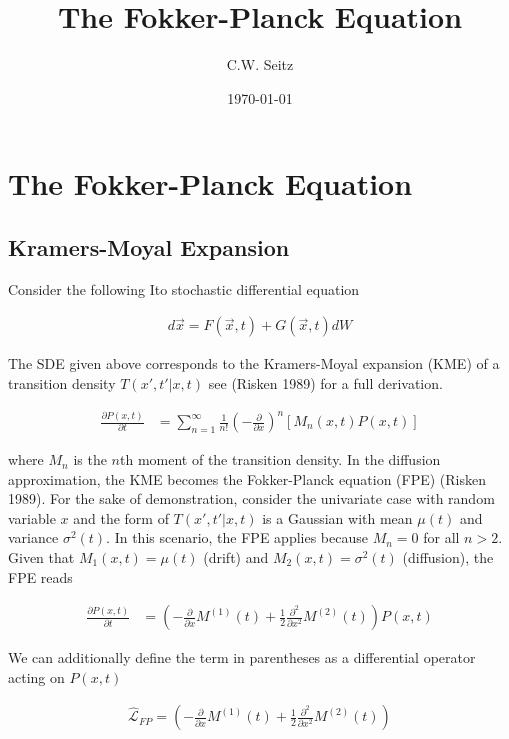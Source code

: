 \documentclass{article}
\title{The Fokker-Planck Equation}
\author{C.W. Seitz}
\date{\today}
\begin{document}
\maketitle

\section{The Fokker-Planck Equation}

\subsection{Kramers-Moyal Expansion}

Consider the following Ito stochastic differential equation 

\begin{align*}
d\vec{x} = F(\vec{x},t) + G(\vec{x},t)dW
\end{align*}

The SDE given above corresponds to the Kramers-Moyal expansion (KME) of a transition density $T(x',t'|x,t)$ see (Risken 1989) for a full derivation.

\begin{align}
\frac{\partial P(x,t)}{\partial t}  &= \sum_{n=1}^{\infty} \frac{1}{n!}\left(-\frac{\partial}{\partial x}\right)^{n} \left[M_{n}(x,t)P(x,t)\right]
\end{align}

where $M_{n}$ is the $n$th moment of the transition density. In the diffusion approximation, the KME becomes the Fokker-Planck equation (FPE) (Risken 1989). For the sake of demonstration, consider the univariate case with random variable $x$ and the form of $T(x',t'|x,t)$ is a Gaussian with mean $\mu(t)$ and variance $\sigma^{2}(t)$. In this scenario, the FPE applies because $M_{n} = 0$ for all $n > 2$. Given that $M_{1}(x,t) = \mu(t)$ (drift) and $M_{2}(x,t) = \sigma^{2}(t)$ (diffusion), the FPE reads

\begin{align}
\frac{\partial P(x,t)}{\partial t}  &= \left(-\frac{\partial}{\partial x}M^{(1)}(t) + \frac{1}{2}\frac{\partial^{2}}{\partial x^{2}}M^{(2)}(t)\right)P(x,t)
\end{align}

We can additionally define the term in parentheses as a differential operator acting on $P(x,t)$

\begin{align}
\hat{\mathcal{L}}_{FP} = \left(-\frac{\partial}{\partial x}M^{(1)}(t) + \frac{1}{2}\frac{\partial^{2}}{\partial x^{2}}M^{(2)}(t)\right)
\end{align}
\end{document}
